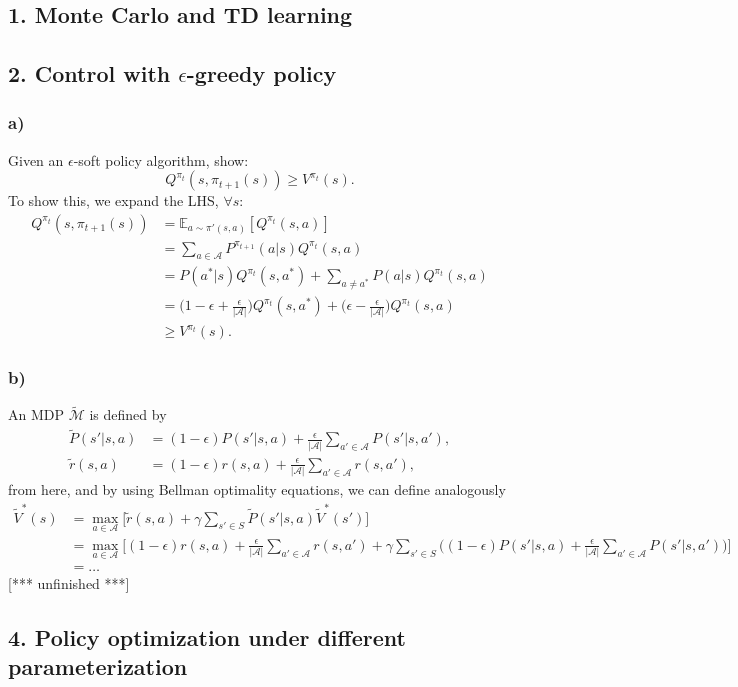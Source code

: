\documentclass[12pt]{article}
\def\att{                    %
        \marginpar[ \hspace*{\fill} \raisebox{-0.2em}{\rule{2mm}{1.2em}} ]
        {\raisebox{-0.2em}{\rule{2mm}{1.2em}} }
        }
\def\at#1{[*** \att #1 ***]}  %
\begin{document}
\subsection*{1. Monte Carlo and TD learning}

\subsection*{2. Control with $\epsilon$-greedy policy}

\subsubsection*{a)}
Given an $\epsilon$-soft policy algorithm, show:
\begin{equation}
	Q^{\pi_t}(s,\pi_{t+1}(s)) \geq V^{\pi_t}(s).
\end{equation}
To show this, we expand the LHS, $\forall s$:
\begin{equation}
	\begin{split}
		Q^{\pi_t}(s,\pi_{t+1}(s)) &= \mathbb{E}_{a\sim\pi'(s,a)}[Q^{\pi_{t}}(s,a)] \\
		&= \sum_{a \in \mathcal{A}} P^{\pi_{t+1}}(a|s)Q^{\pi_{t}}(s,a) \\
		&= P(a^*|s)Q^{\pi_{t}}(s,a^*) + \sum_{a \neq a^*}P(a|s)Q^{\pi_{t}}(s,a) \\
		&=\Big(1-\epsilon+\frac{\epsilon}{|\mathcal{A}|}\Big)Q^{\pi_{t}}(s,a^*) + \Big(\epsilon - \frac{\epsilon}{|\mathcal{A}|}\Big)Q^{\pi_{t}}(s,a) \\
		&\geq V^{\pi_t}(s).
	\end{split}
\end{equation}

\subsubsection*{b)}
An MDP $\tilde{\mathcal{M}}$ is defined by
\begin{equation}
	\begin{split}
		\tilde{P}(s'|s,a) &= (1-\epsilon)P(s'|s,a) + \frac{\epsilon}{|\mathcal{A}|}\sum_{a' \in \mathcal{A}}P(s'|s,a'),\\
		\tilde{r}(s,a) &= (1-\epsilon)r(s,a) +  \frac{\epsilon}{|\mathcal{A}|}\sum_{a' \in \mathcal{A}}r(s,a'),
	\end{split}	
\end{equation}
from here, and by using Bellman optimality equations, we can define analogously 
\begin{equation}
	\begin{split}
		\tilde{V}^*(s) &= \max_{a \in \mathcal{A}} \Big[\tilde{r}(s,a) + \gamma \sum_{s'\in S} \tilde{P}(s'|s,a)\tilde{V}^*(s')\Big] \\
		&= \max_{a \in \mathcal{A}} \Big[(1-\epsilon)r(s,a) +  \frac{\epsilon}{|\mathcal{A}|}\sum_{a' \in \mathcal{A}}r(s,a') + \gamma \sum_{s'\in S} \Big((1-\epsilon)P(s'|s,a) + \frac{\epsilon}{|\mathcal{A}|}\sum_{a' \in \mathcal{A}}P(s'|s,a')\Big)\Big] \\
		&= \dots
	\end{split}
\end{equation}
\at{unfinished}
\subsection*{4. Policy optimization under different parameterization}
\end{document}
